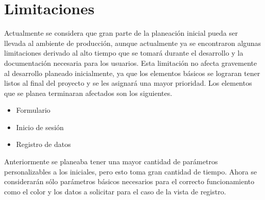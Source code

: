\section{Limitaciones}
Actualmente se considera que gran parte de la planeación inicial pueda ser llevada al ambiente de producción, aunque actualmente ya se encontraron algunas limitaciones derivado al alto tiempo que se tomará durante el desarrollo y la documentación necesaria para los usuarios.
Esta limitación no afecta gravemente al desarrollo planeado inicialmente, ya que los elementos básicos se lograran tener listos al final del proyecto y se les asignará una mayor prioridad.
Los elementos que se planea terminaran afectados son los siguientes. 
\newline
\begin{itemize}
\item  Formulario
\item Inicio de sesión
\item Registro de datos
\end{itemize}
\newline
Anteriormente se planeaba tener una mayor cantidad de parámetros personalizables a los iniciales, pero esto toma gran cantidad de tiempo.
Ahora se considerarán sólo parámetros básicos necesarios para el correcto funcionamiento como el color y los datos a solicitar para el caso de la vista de registro.

  